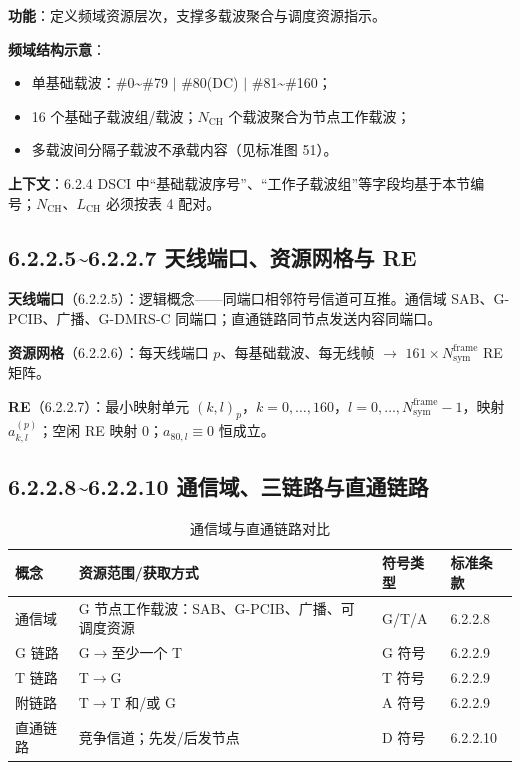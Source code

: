 \documentclass[11pt,a4paper]{ctexart}
\begin{document}
\textbf{功能}：定义频域资源层次，支撑多载波聚合与调度资源指示。

\textbf{频域结构示意}：
\begin{itemize}[nosep]
  \item 单基础载波：\#0\textasciitilde\#79 $|$ \#80(DC) $|$ \#81\textasciitilde\#160；
  \item 16 个基础子载波组/载波；$N_{\mathrm{CH}}$ 个载波聚合为节点工作载波；
  \item 多载波间分隔子载波不承载内容（见标准图 51）。
\end{itemize}

\textbf{上下文}：6.2.4 DSCI 中``基础载波序号''、``工作子载波组''等字段均基于本节编号；$N_{\mathrm{CH}}$、$L_{\mathrm{CH}}$ 必须按表 4 配对。

\subsection{6.2.2.5\textasciitilde 6.2.2.7 天线端口、资源网格与 RE}

\textbf{天线端口}（6.2.2.5）：逻辑概念——同端口相邻符号信道可互推。通信域 SAB、G-PCIB、广播、G-DMRS-C 同端口；直通链路同节点发送内容同端口。

\textbf{资源网格}（6.2.2.6）：每天线端口 $p$、每基础载波、每无线帧 $\rightarrow$ $161 \times N_{\mathrm{sym}}^{\mathrm{frame}}$ RE 矩阵。

\textbf{RE}（6.2.2.7）：最小映射单元 $(k,l)_p$，$k{=}0,\ldots,160$，$l{=}0,\ldots,N_{\mathrm{sym}}^{\mathrm{frame}}{-}1$，映射 $a_{k,l}^{(p)}$；空闲 RE 映射 0；$a_{80,l}\equiv 0$ 恒成立。

\subsection{6.2.2.8\textasciitilde 6.2.2.10 通信域、三链路与直通链路}

\begin{table}[h]
\centering
\small
\caption{通信域与直通链路对比}
\begin{tabular}{L{2.5cm}L{4.5cm}L{3.5cm}L{3cm}}
\toprule
\textbf{概念} & \textbf{资源范围/获取方式} & \textbf{符号类型} & \textbf{标准条款} \\
\midrule
通信域 & G 节点工作载波：SAB、G-PCIB、广播、可调度资源 & G/T/A & 6.2.2.8 \\
G 链路 & G$\rightarrow$至少一个 T & G 符号 & 6.2.2.9 \\
T 链路 & T$\rightarrow$G & T 符号 & 6.2.2.9 \\
附链路 & T$\rightarrow$T 和/或 G & A 符号 & 6.2.2.9 \\
直通链路 & 竞争信道；先发/后发节点 & D 符号 & 6.2.2.10 \\
\bottomrule
\end{tabular}
\end{table}
\end{document}
